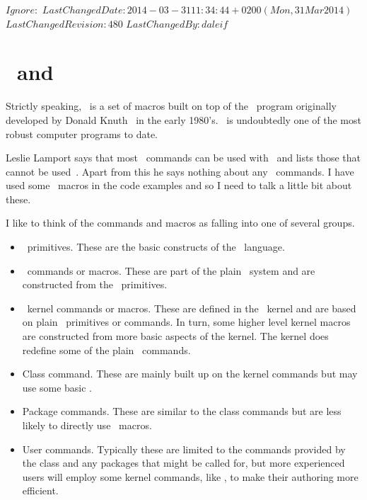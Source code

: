 \svnidlong
{$Ignore: $}
{$LastChangedDate: 2014-03-31 11:34:44 +0200 (Mon, 31 Mar 2014) $}
{$LastChangedRevision: 480 $}
{$LastChangedBy: daleif $}


\chapter{\ltx\ and \tx} \label{appendix:alltex}


    Strictly speaking, \ltx\ is a set of macros built on top of 
the \tx\ program originally developed by 
Donald Knuth~\cite{TEXPROGRAM,TEXBOOK} 
in the early
1980's. \tx\ is undoubtedly one of the most robust computer programs
to date. 

    Leslie Lamport says that most \tx\ commands can be used with 
\ltx\ and lists those that cannot be used~\cite[Appendix E]{LAMPORT94}.
Apart from this he says nothing about any \tx\ commands. I have used
some \tx\ macros in the code examples and so I need to talk a little
bit about these.

    I like to think of the commands and
macros as falling into one of several groups.
\begin{itemize}

\item \tx\ primitives. These are the basic constructs of the \tx\ language.

\item \tx\ commands or macros. These are part of the plain \tx\ system 
      and are
      constructed from the \tx\ primitives.

\item \ltx\ kernel commands or macros. These are defined in the \ltx\ kernel
      and are based on plain \tx\ primitives or commands. In turn, some 
      higher level kernel macros are constructed from more basic aspects
      of the kernel. The kernel does redefine some of the plain \tx\ commands.
      

\item Class command. These are mainly built up on the kernel commands but
      may use some basic \tx.

\item Package commands. These are similar to the class commands but are
      less likely to directly use \tx\ macros.

\item User commands. Typically these are limited to the commands
      provided by the class and any packages that might be called for,
      but more experienced users will employ some kernel commands,
      like \cmd{\newcommand}, to make their authoring more efficient.
\end{itemize}

